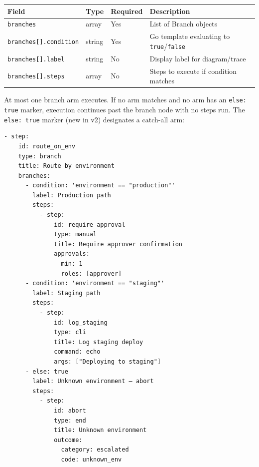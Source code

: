 \begin{center}
\begin{tabular}{lllp{5cm}}
\hline
\textbf{Field} & \textbf{Type} & \textbf{Required} & \textbf{Description} \\
\hline
\texttt{branches}           & array  & Yes & List of Branch objects \\
\texttt{branches[].condition} & string & Yes & Go template evaluating to \texttt{true}/\texttt{false} \\
\texttt{branches[].label}   & string & No  & Display label for diagram/trace \\
\texttt{branches[].steps}   & array  & No  & Steps to execute if condition matches \\
\hline
\end{tabular}
\end{center}

At most one branch arm executes.  If no arm matches and no arm has an
\texttt{else: true} marker, execution continues past the branch node with no
steps run.  The \texttt{else: true} marker (new in v2) designates a catch-all
arm:

\begin{verbatim}
- step:
    id: route_on_env
    type: branch
    title: Route by environment
    branches:
      - condition: 'environment == "production"'
        label: Production path
        steps:
          - step:
              id: require_approval
              type: manual
              title: Require approver confirmation
              approvals:
                min: 1
                roles: [approver]
      - condition: 'environment == "staging"'
        label: Staging path
        steps:
          - step:
              id: log_staging
              type: cli
              title: Log staging deploy
              command: echo
              args: ["Deploying to staging"]
      - else: true
        label: Unknown environment — abort
        steps:
          - step:
              id: abort
              type: end
              title: Unknown environment
              outcome:
                category: escalated
                code: unknown_env
\end{verbatim}

